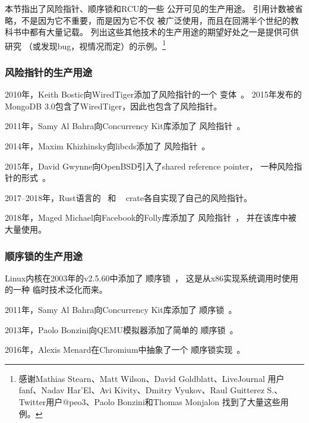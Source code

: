 本节指出了风险指针、顺序锁和RCU的一些
公开可见的生产用途。
引用计数被省略，不是因为它不重要，而是因为它不仅
被广泛使用，而且在回溯半个世纪的教科书中都有大量记载。
列出这些其他技术的生产用途的期望好处之一是提供可供研究
（或发现bug，视情况而定）的示例。\footnote{
	感谢Mathias Stearn、Matt Wilson、David Goldblatt、LiveJournal
	用户fanf、Nadav Har'El、Avi Kivity、Dmitry Vyukov、Raul Guitterez
	S.、Twitter用户@peo3、Paolo Bonzini和Thomas Monjalon
	找到了大量这些用例。}

\subsubsection{风险指针的生产用途}
\label{sec:defer:Production Uses of Hazard Pointers}

2010年，Keith Bostic向WiredTiger添加了风险指针的一个
变体~\cite{KeithBostic2010WiredTigerhazptr}。
2015年发布的MongoDB 3.0包含了WiredTiger，因此也包含了风险指针。

2011年，Samy Al Bahra向Concurrency Kit库添加了
风险指针~\cite{SamyAlBahra2011ckhp}。

2014年，Maxim Khizhinsky向libcds添加了
风险指针~\cite{MaximKhizhinsky2014libcdsHazptr}。

2015年，David Gwynne向OpenBSD引入了shared reference pointer，
一种风险指针的形式~\cite{DavidGwynne2015srp}。

2017--2018年，Rust语言的
~\cite{MichalVaner2018arc-swapHazptr}和
~\cite{crates.io.user.ticki2017concHazptr}
crate各自实现了自己的风险指针。

2018年，Maged Michael向Facebook的Folly库添加了
风险指针~\cite{MagedMichael2018FollyHazptr}，
并在该库中被大量使用。

\subsubsection{顺序锁的生产用途}
\label{sec:defer:Production Uses of Sequence Locking}

Linux内核在2003年的v2.5.60中添加了
顺序锁~\cite{JonathanCorbet2003seqlock}，
这是从x86实现系统调用时使用的一种
临时技术泛化而来。

2011年，Samy Al Bahra向Concurrency Kit库添加了
顺序锁~\cite{SamyAlBahra2011ckseqlock}。

2013年，Paolo Bonzini向QEMU模拟器添加了简单的
顺序锁~\cite{PaoloBonzini2013QEMUseqlock}。

2016年，Alexis Menard在Chromium中抽象了一个
顺序锁实现~\cite{AlexisMenard2016ChromiumSeqLock}。

